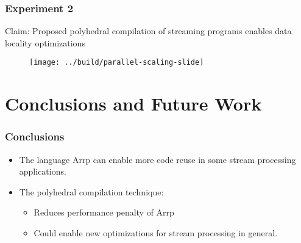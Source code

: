 \documentclass{beamer}
\begin{document}
\begin{frame}
\frametitle{Experiment 2}

Claim: Proposed polyhedral compilation of streaming programs enables data locality optimizations

\begin{figure}
\centering
\texttt{[image: ../build/parallel-scaling-slide]}
\end{figure}

\end{frame}



\section{Conclusions and Future Work}

\begin{frame}
\frametitle{Conclusions}

\begin{itemize}
\item The language Arrp can enable more code reuse in some stream processing applications.
\item The polyhedral compilation technique:
  \begin{itemize}
  \item Reduces performance penalty of Arrp
  \item Could enable new optimizations for stream processing in general.
  \end{itemize}
\end{itemize}

\end{frame}
\end{document}
